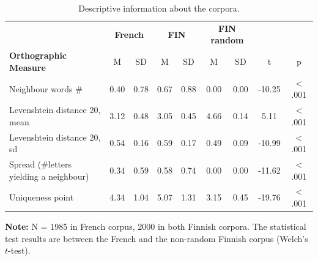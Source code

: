 
\begin{table}[htbp]
\centering
\caption{Descriptive information about the corpora.}
\label{tab:corpora}
\begin{tabular}{|l|cc|cc|cc|c|c|}
\hline
 & \multicolumn{2}{c|}{\textbf{French}} & \multicolumn{2}{c|}{\textbf{FIN}} & \multicolumn{2}{c|}{\textbf{FIN random}} & & \\
\textbf{Orthographic Measure} & M & SD & M & SD & M & SD & t & p \\
\hline
Neighbour words \# & 0.40 & 0.78 & 0.67 & 0.88 & 0.00 & 0.00 & -10.25 & $<$.001 \\
Levenshtein distance 20, mean & 3.12 & 0.48 & 3.05 & 0.45 & 4.66 & 0.14 & 5.11 & $<$.001 \\
Levenshtein distance 20, sd & 0.54 & 0.16 & 0.59 & 0.17 & 0.49 & 0.09 & -10.99 & $<$.001 \\
Spread (\#letters yielding a neighbour) & 0.34 & 0.59 & 0.58 & 0.74 & 0.00 & 0.00 & -11.62 & $<$.001 \\
Uniqueness point & 4.34 & 1.04 & 5.07 & 1.31 & 3.15 & 0.45 & -19.76 & $<$.001 \\
\hline
\end{tabular}

\vspace{2mm}
\begin{minipage}{0.9\textwidth}
\footnotesize \textbf{Note:} N = 1985 in French corpus, 2000 in both Finnish corpora. The statistical test results are between the French and the non-random Finnish corpus (Welch's $t$-test).
\end{minipage}
\end{table}



